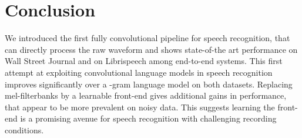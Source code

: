 \documentclass[a4paper]{article}
\begin{document}
\section{Conclusion}

We introduced the first fully convolutional pipeline for speech recognition, that can directly process the raw waveform and shows state-of-the art performance on Wall Street Journal and on Librispeech among end-to-end systems. This first attempt at exploiting convolutional language models in speech recognition improves significantly over a -gram language model on both datasets. Replacing mel-filterbanks by a learnable front-end gives additional gains in performance, that appear to be more prevalent on noisy data. This suggests learning the front-end is a promising avenue for speech recognition with challenging recording conditions.





\end{document}
